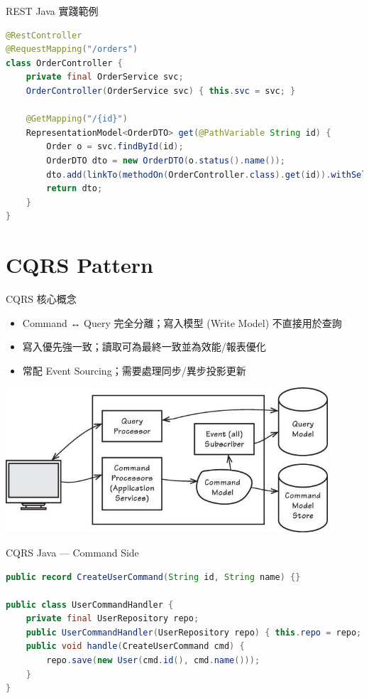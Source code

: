 \documentclass[UTF8]{beamer}
\begin{document}
\begin{frame}[fragile]{REST Java 實踐範例}
    \begin{lstlisting}[language=Java]
@RestController
@RequestMapping("/orders")
class OrderController {
    private final OrderService svc;
    OrderController(OrderService svc) { this.svc = svc; }

    @GetMapping("/{id}")
    RepresentationModel<OrderDTO> get(@PathVariable String id) {
        Order o = svc.findById(id);
        OrderDTO dto = new OrderDTO(o.status().name());
        dto.add(linkTo(methodOn(OrderController.class).get(id)).withSelfRel());
        return dto;
    }
}
    \end{lstlisting}
\end{frame}



\section{CQRS Pattern}
\begin{frame}{CQRS 核心概念}
  \begin{itemize}
    \item Command ↔ Query 完全分離；寫入模型 (Write Model) 不直接用於查詢
    \item 寫入優先強一致；讀取可為最終一致並為效能/報表優化
    \item 常配 Event Sourcing；需要處理同步/異步投影更新
  \end{itemize}
  \begin{center}
    \includegraphics[width=0.9\textwidth]{img/cqrs-diagram.png}
  \end{center}
\end{frame}

\begin{frame}[fragile]{CQRS Java — Command Side}
\begin{lstlisting}[language=Java]
public record CreateUserCommand(String id, String name) {}

public class UserCommandHandler {
    private final UserRepository repo;
    public UserCommandHandler(UserRepository repo) { this.repo = repo; }
    public void handle(CreateUserCommand cmd) {
        repo.save(new User(cmd.id(), cmd.name()));
    }
}
\end{lstlisting}
\end{frame}
\end{document}
